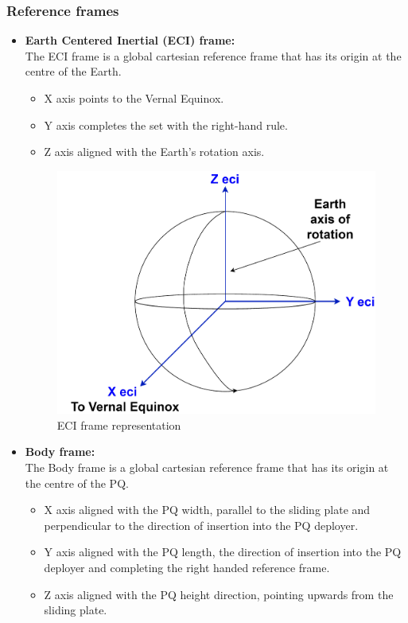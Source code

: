 \subsubsection{Reference frames}
\begin{itemize}
    \item \textbf{Earth Centered Inertial (ECI) frame:}\\
    The ECI frame is a global cartesian reference frame that has its origin at the centre of the
    Earth.
    \begin{itemize}
        \item X axis points to the Vernal Equinox.
        \item Y axis completes the set with the right-hand rule.
        \item Z axis aligned with the Earth's rotation axis.
    \end{itemize}

    \begin{figure}[H]
        \centering
        \includegraphics[width=0.4\linewidth]{res/img/3_simulation_performance/ECI frame.drawio.pdf}
        \caption{ECI frame representation}
        \label{fig:ECIframe}
    \end{figure}

    \item \textbf{Body frame:}\\
    The Body frame is a global cartesian reference frame that has its origin at the centre of
    the PQ.
    \begin{itemize}
        \item X axis aligned with the PQ width, parallel to the sliding plate and perpendicular
        to the direction of insertion into the PQ deployer.
        \item Y axis aligned with the PQ length, the direction of insertion into the
        PQ deployer and completing the right handed reference frame.
        \item Z axis aligned with the PQ height direction, pointing upwards from the
        sliding plate.

    \end{itemize}


\end{itemize}
